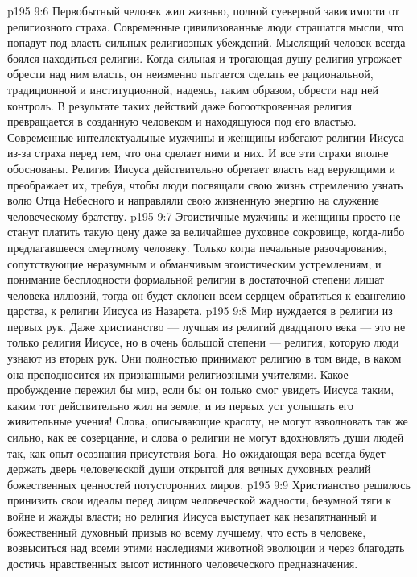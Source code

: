 \vs p195 9:6 \pc Первобытный человек жил жизнью, полной суеверной зависимости от религиозного страха. Современные цивилизованные люди страшатся мысли, что попадут под власть сильных религиозных убеждений. Мыслящий человек всегда боялся находиться  религии. Когда сильная и трогающая душу религия угрожает обрести над ним власть, он неизменно пытается сделать ее рациональной, традиционной и институционной, надеясь, таким образом, обрести над ней контроль. В результате таких действий даже богооткровенная религия превращается в созданную человеком и находящуюся под его властью. Современные интеллектуальные мужчины и женщины избегают религии Иисуса из\hyp{}за страха перед тем, что она сделает  ними и  них. И все эти страхи вполне обоснованы. Религия Иисуса действительно обретает власть над верующими и преображает их, требуя, чтобы люди посвящали свою жизнь стремлению узнать волю Отца Небесного и направляли свою жизненную энергию на служение человеческому братству.
\vs p195 9:7 Эгоистичные мужчины и женщины просто не станут платить такую цену даже за величайшее духовное сокровище, когда\hyp{}либо предлагавшееся смертному человеку. Только когда печальные разочарования, сопутствующие неразумным и обманчивым эгоистическим устремлениям, и понимание бесплодности формальной религии в достаточной степени лишат человека иллюзий, тогда он будет склонен всем сердцем обратиться к евангелию царства, к религии Иисуса из Назарета.
\vs p195 9:8 Мир нуждается в религии из первых рук. Даже христианство --- лучшая из религий двадцатого века --- это не только религия  Иисусе, но в очень большой степени --- религия, которую люди узнают из вторых рук. Они полностью принимают религию в том виде, в каком она преподносится их признанными религиозными учителями. Какое пробуждение пережил бы мир, если бы он только смог увидеть Иисуса таким, каким тот действительно жил на земле, и из первых уст услышать его живительные учения! Слова, описывающие красоту, не могут взволновать так же сильно, как ее созерцание, и слова о религии не могут вдохновлять души людей так, как опыт осознания присутствия Бога. Но ожидающая вера всегда будет держать дверь человеческой души открытой для вечных духовных реалий божественных ценностей потусторонних миров.
\vs p195 9:9 \pc Христианство решилось принизить свои идеалы перед лицом человеческой жадности, безумной тяги к войне и жажды власти; но религия Иисуса выступает как незапятнанный и божественный духовный призыв ко всему лучшему, что есть в человеке, возвыситься над всеми этими наследиями животной эволюции и через благодать достичь нравственных высот истинного человеческого предназначения.
